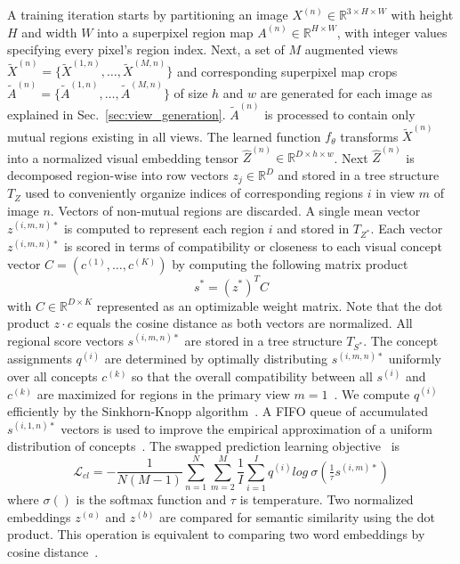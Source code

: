 \documentclass{bmvc2k}
\begin{document}
A training iteration starts by partitioning an image $X^{(n)} \in \mathbb{R}^{3 \times H \times W}$ with height $H$ and width $W$ into a superpixel region map $A^{(n)} \in \mathbb{R}^{H \times W}$, with integer values specifying every pixel’s region index. Next, a set of $M$ augmented views $\tilde{X}^{(n)} = \{ \tilde{X}^{(1,n)}, \dots, \tilde{X}^{(M,n)} \}$ and corresponding superpixel map crops $\tilde{A}^{(n)} = \{ \tilde{A}^{(1,n)}, \dots, \tilde{A}^{(M,n)} \}$ of size $h$ and $w$ are generated for each image as explained in Sec.~\ref{sec:view_generation}. $\tilde{A}^{(n)}$ is processed to contain only mutual regions existing in all views. 
The learned function $f_\theta$ transforms $\tilde{X}^{(n)}$ into a normalized visual embedding tensor $\hat{Z}^{(n)} \in \mathbb{R}^{D \times h \times w}$. Next $\hat{Z}^{(n)}$ is decomposed region-wise into row vectors $z_j \in \mathbb{R}^D$ and stored in a tree structure $T_Z$ used to conveniently organize indices of corresponding regions $i$ in view $m$ of image $n$. Vectors of non-mutual regions are discarded. A single mean vector $z^{(i,m,n)*}$ is computed to represent each region $i$ and stored in $T_{Z^*}$. Each vector $z^{(i,m,n)*}$ is scored in terms of compatibility or closeness to each visual concept vector $C = (c^{(1)}, \dots, c^{(K)})$ by computing the following matrix product
\begin{equation}
    s^* = (z^*)^T C
\end{equation}
\noindent with $C \in \mathbb{R}^{D \times K}$ represented as an optimizable weight matrix. Note that the dot product $z \cdot c$ equals the cosine distance as both vectors are normalized. All regional score vectors $s^{(i,m,n)*}$ are stored in a tree structure $T_{S^*}$. The concept assignments $q^{(i)}$ are determined by optimally distributing $s^{(i,m,n)*}$ uniformly over all concepts $c^{(k)}$ so that the overall compatibility between all $s^{(i)}$ and $c^{(k)}$ are maximized for regions in the primary view $m=1$~\cite{Caron2020SwAV}. We compute $q^{(i)}$ efficiently by the Sinkhorn-Knopp algorithm~\cite{Asano2020SeLA, Cuturi2013OptimalTransport}. A FIFO queue of accumulated $s^{(i,1,n)*}$ vectors is used to improve the empirical approximation of a uniform distribution of concepts~\cite{Asano2020SeLA, Caron2020SwAV}. The swapped prediction learning objective~\cite{Caron2020SwAV} is
\begin{equation}
\label{eq:clustering_loss}
  \mathcal{L}_{cl} = -\frac{1}{N (M-1)} \sum^N_{n = 1} \sum^M_{m = 2} \frac{1}{I} \sum^I_{i = 1} q^{(i)} log \: \sigma \left( \tfrac{1}{\tau} s^{(i,m)*} \right)
\end{equation}
\noindent where $\sigma ()$ is the softmax function and $\tau$ is temperature. Two normalized embeddings $z^{(a)}$ and $z^{(b)}$ are compared for semantic similarity using the dot product. This operation is equivalent to comparing two word embeddings by cosine distance~\cite{Mikolov2013DistributedRO, Mikolov2013EffWordRep}.
\end{document}
